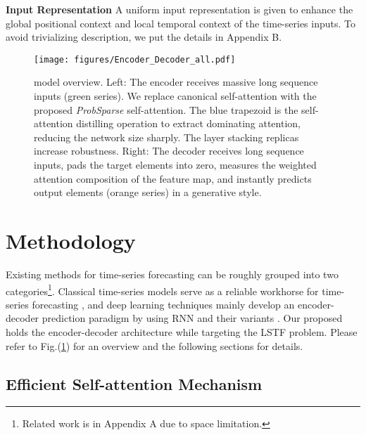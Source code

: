 \textbf{Input Representation} A uniform input representation is given to enhance the global positional context and local temporal context of the time-series inputs. To avoid trivializing description, we put the details in Appendix B.

\begin{figure}
\centering
\texttt{[image: figures/Encoder\_Decoder\_all.pdf]}
\caption{{\mn} model overview. Left: The encoder receives massive long sequence inputs (green series). We replace canonical self-attention with the proposed \emph{ProbSparse} self-attention. The blue trapezoid is the self-attention distilling operation to extract dominating attention, reducing the network size sharply. The layer stacking replicas increase robustness. Right: The decoder receives long sequence inputs, pads the target elements into zero, measures the weighted attention composition of the feature map, and instantly predicts output elements (orange series) in a generative style.}
\label{fig:method.en.de.all}
\end{figure}

\section{Methodology}
Existing methods for time-series forecasting can be roughly grouped into two categories\footnote{Related work is in Appendix A due to space limitation.}. Classical time-series models serve as a reliable workhorse for time-series forecasting \cite{box2015time,ray1990time,seeger2017approximate,seeger2016bayesian}, and deep learning techniques mainly develop an encoder-decoder prediction paradigm by using RNN and their variants \cite{hochreiter1997long,li2017graph,yu2017long}.
Our proposed {\mn} holds the encoder-decoder architecture while targeting the LSTF problem. Please refer to Fig.(\ref{fig:method.en.de.all}) for an overview and the following sections for details.

\subsection{Efficient Self-attention Mechanism}
\label{sec:method.transformer.attention}


